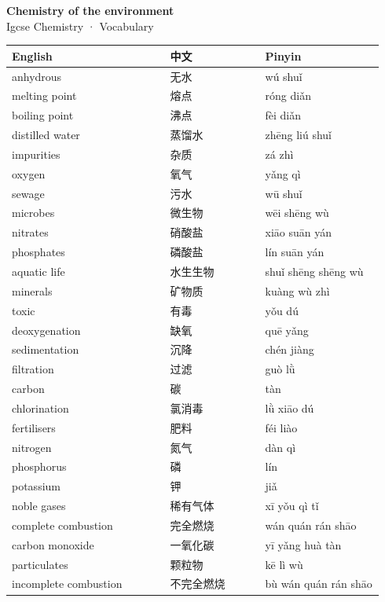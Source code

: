 \documentclass[11pt]{article}
\begin{document}
\begin{center}
  {\LARGE\bfseries Chemistry of the environment}\\[0.35em]
  {\large Igcse Chemistry · Vocabulary}
\end{center}
\vspace{0.6em}

\begin{longtable}{@{}p{0.40\linewidth}p{0.24\linewidth}p{0.30\linewidth}@{}}
\toprule
\textbf{English} & \textbf{中文} & \textbf{Pinyin} \\
\midrule
\endhead
\bottomrule
\endlastfoot
anhydrous & 无水 & wú shuǐ \\
melting point & 熔点 & róng diǎn \\
boiling point & 沸点 & fèi diǎn \\
distilled water & 蒸馏水 & zhēng liú shuǐ \\
impurities & 杂质 & zá zhì \\
oxygen & 氧气 & yǎng qì \\
sewage & 污水 & wū shuǐ \\
microbes & 微生物 & wēi shēng wù \\
nitrates & 硝酸盐 & xiāo suān yán \\
phosphates & 磷酸盐 & lín suān yán \\
aquatic life & 水生生物 & shuǐ shēng shēng wù \\
minerals & 矿物质 & kuàng wù zhì \\
toxic & 有毒 & yǒu dú \\
deoxygenation & 缺氧 & quē yǎng \\
sedimentation & 沉降 & chén jiàng \\
filtration & 过滤 & guò lǜ \\
carbon & 碳 & tàn \\
chlorination & 氯消毒 & lǜ xiāo dú \\
fertilisers & 肥料 & féi liào \\
nitrogen & 氮气 & dàn qì \\
phosphorus & 磷 & lín \\
potassium & 钾 & jiǎ \\
noble gases & 稀有气体 & xī yǒu qì tǐ \\
complete combustion & 完全燃烧 & wán quán rán shāo \\
carbon monoxide & 一氧化碳 & yī yǎng huà tàn \\
particulates & 颗粒物 & kē lì wù \\
incomplete combustion & 不完全燃烧 & bù wán quán rán shāo \\

\end{longtable}
\end{document}
